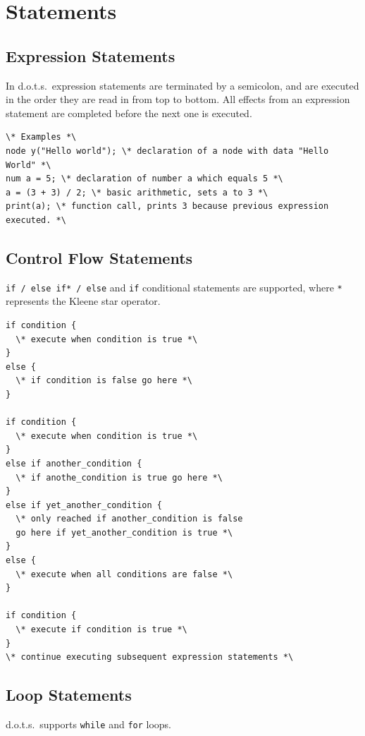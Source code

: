\documentclass{article}
\newcommand{\pltlang}{d.o.t.s.} %
\newcommand{\code}[1]{\texttt{#1}} %
\begin{document}
\section{Statements}

\subsection{Expression Statements}
In \pltlang\ expression statements are terminated by a semicolon, and are executed in the order they are read in from top to bottom. All effects from an expression statement are completed before the next one is executed.

\begin{lstlisting}[language=pltLang, label=lst:expression-statements]
\* Examples *\
node y("Hello world"); \* declaration of a node with data "Hello World" *\
num a = 5; \* declaration of number a which equals 5 *\
a = (3 + 3) / 2; \* basic arithmetic, sets a to 3 *\
print(a); \* function call, prints 3 because previous expression executed. *\

\end{lstlisting}

\subsection{Control Flow Statements}
\code{if / else if* / else} and \code{if} conditional statements are supported, where \code{*} represents the Kleene star operator.

\begin{lstlisting}[language=pltLang, label=lst:if-else]
if condition {
  \* execute when condition is true *\
}
else {
  \* if condition is false go here *\
}

if condition {
  \* execute when condition is true *\
}
else if another_condition {
  \* if anothe_condition is true go here *\
}
else if yet_another_condition {
  \* only reached if another_condition is false
  go here if yet_another_condition is true *\
}
else {
  \* execute when all conditions are false *\
}

if condition {
  \* execute if condition is true *\
}
\* continue executing subsequent expression statements *\

\end{lstlisting}

\subsection{Loop Statements}
\pltlang\ supports \code{while} and \code{for} loops.
\end{document}
